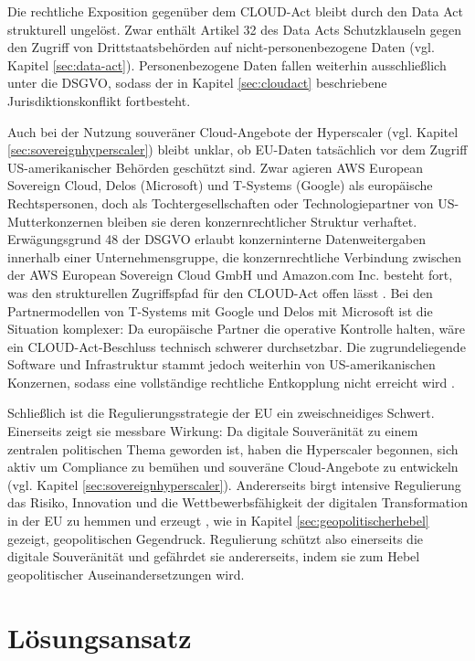 Die rechtliche Exposition gegenüber dem \ac{CLOUD-Act}
bleibt durch den Data Act strukturell ungelöst. Zwar 
enthält Artikel 32 des Data Acts Schutzklauseln gegen 
den Zugriff von Drittstaatsbehörden auf 
nicht-personenbezogene Daten (vgl. Kapitel \ref{sec:data-act}). Personenbezogene Daten 
fallen weiterhin ausschließlich unter die \ac{DSGVO}, sodass 
der in Kapitel \ref{sec:cloudact} beschriebene 
Jurisdiktionskonflikt fortbesteht. 

Auch bei der Nutzung souveräner Cloud-Angebote der Hyperscaler (vgl. Kapitel \ref{sec:sovereignhyperscaler})
bleibt unklar, ob EU-Daten tatsächlich vor dem Zugriff 
US-amerikanischer Behörden geschützt sind. Zwar agieren 
AWS European Sovereign Cloud, Delos (Microsoft) und T-Systems (Google) als 
europäische Rechtspersonen, doch als Tochtergesellschaften 
oder Technologiepartner von US-Mutterkonzernen bleiben 
sie deren konzernrechtlicher Struktur verhaftet. 
Erwägungsgrund 48 der \ac{DSGVO} erlaubt konzerninterne 
Datenweitergaben innerhalb 
einer Unternehmensgruppe, die konzernrechtliche 
Verbindung zwischen der AWS European Sovereign Cloud GmbH 
und Amazon.com Inc. besteht fort, was den strukturellen 
Zugriffspfad für den \ac{CLOUD-Act} offen lässt 
\cite[Erw.48]{gdpr2016}. Bei den Partnermodellen 
von T-Systems mit Google und Delos mit Microsoft ist die 
Situation komplexer: Da europäische Partner die 
operative Kontrolle halten, wäre 
ein CLOUD-Act-Beschluss technisch schwerer 
durchsetzbar. Die zugrundeliegende Software und 
Infrastruktur stammt jedoch weiterhin von 
US-amerikanischen Konzernen, sodass eine vollständige 
rechtliche Entkopplung nicht erreicht wird 
\cite{microsoft_sovereign, google_tsystems}.

Schließlich ist die Regulierungsstrategie der \ac{EU} ein 
zweischneidiges Schwert. Einerseits zeigt sie messbare 
Wirkung: Da digitale Souveränität zu einem zentralen 
politischen Thema geworden ist, haben die Hyperscaler 
begonnen, sich aktiv um Compliance zu bemühen und 
souveräne Cloud-Angebote zu entwickeln (vgl. Kapitel \ref{sec:sovereignhyperscaler}). 
Andererseits birgt intensive Regulierung das Risiko, 
Innovation und die Wettbewerbsfähigkeit der digitalen 
Transformation in der \ac{EU} zu hemmen und erzeugt \cite{draghi2024competitiveness}, 
wie in Kapitel \ref{sec:geopolitischerhebel} gezeigt, geopolitischen 
Gegendruck.
Regulierung schützt also einerseits die digitale 
Souveränität und gefährdet sie andererseits, indem 
sie zum Hebel geopolitischer Auseinandersetzungen wird.

\section{Lösungsansatz}
\label{ch:loesungsansatz}

